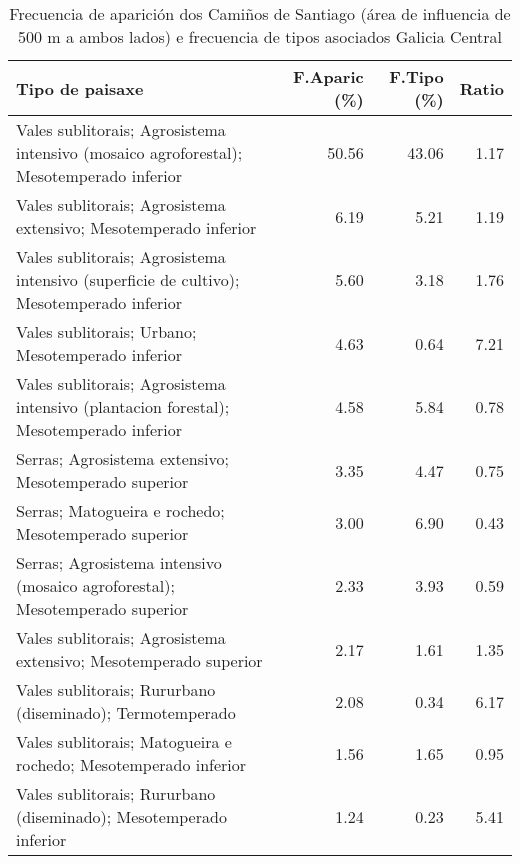 \begin{table}[p]
\centering
\caption{Frecuencia de aparición dos Camiños de Santiago (área de influencia de 500 m a ambos lados) e frecuencia de tipos asociados Galicia Central} 
\label{vcamino7}
\begin{tabular}{lrrr}
  \hline
Tipo de paisaxe & F.Aparic (\%) & F.Tipo (\%) & Ratio \\ 
  \hline
Vales sublitorais; Agrosistema intensivo (mosaico agroforestal); Mesotemperado inferior & 50.56 & 43.06 & 1.17 \\ 
  Vales sublitorais; Agrosistema extensivo; Mesotemperado inferior & 6.19 & 5.21 & 1.19 \\ 
  Vales sublitorais; Agrosistema intensivo (superficie de cultivo); Mesotemperado inferior & 5.60 & 3.18 & 1.76 \\ 
  Vales sublitorais; Urbano; Mesotemperado inferior & 4.63 & 0.64 & 7.21 \\ 
  Vales sublitorais; Agrosistema intensivo (plantacion forestal); Mesotemperado inferior & 4.58 & 5.84 & 0.78 \\ 
  Serras; Agrosistema extensivo; Mesotemperado superior & 3.35 & 4.47 & 0.75 \\ 
  Serras; Matogueira e rochedo; Mesotemperado superior & 3.00 & 6.90 & 0.43 \\ 
  Serras; Agrosistema intensivo (mosaico agroforestal); Mesotemperado superior & 2.33 & 3.93 & 0.59 \\ 
  Vales sublitorais; Agrosistema extensivo; Mesotemperado superior & 2.17 & 1.61 & 1.35 \\ 
  Vales sublitorais; Rururbano (diseminado); Termotemperado & 2.08 & 0.34 & 6.17 \\ 
  Vales sublitorais; Matogueira e rochedo; Mesotemperado inferior & 1.56 & 1.65 & 0.95 \\ 
  Vales sublitorais; Rururbano (diseminado); Mesotemperado inferior & 1.24 & 0.23 & 5.41 \\ 
   \hline
\end{tabular}
\end{table}
